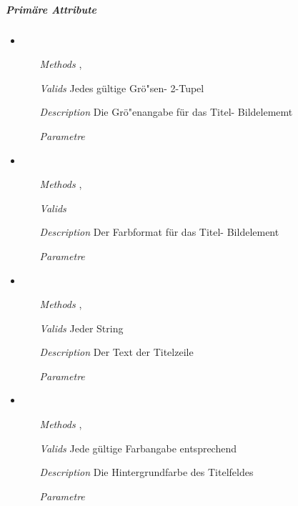 \subparagraph{Prim\"are Attribute}
\begin{itemize}

\item {}
\begin{enumerate}
\item[\textit{Methods}] 
, 
\item[\textit{Valids}] Jedes g\"ultige Gr\"o"sen- 2-Tupel
\item[\textit{Description}] Die Gr\"o"enangabe f\"ur das 
Titel- Bildelememt
\item[\textit{Parametre}] 
\end{enumerate}

\item {}
\begin{enumerate}
\item[\textit{Methods}]
,
\item[\textit{Valids}] 
\item[\textit{Description}] Der Farbformat f\"ur das
Titel- Bildelement
\item[\textit{Parametre}] 
\end{enumerate}

\item {}
\begin{enumerate}
\item[\textit{Methods}] ,
\item[\textit{Valids}] Jeder String
\item[\textit{Description}] Der Text der Titelzeile
\item[\textit{Parametre}] 
\end{enumerate}

\item {}
\begin{enumerate}
\item[\textit{Methods}] 
,
\item[\textit{Valids}] Jede g\"ultige Farbangabe entsprechend
\item[\textit{Description}] Die Hintergrundfarbe des 
Titelfeldes
\item[\textit{Parametre}] 
\end{enumerate}


\end{itemize}
